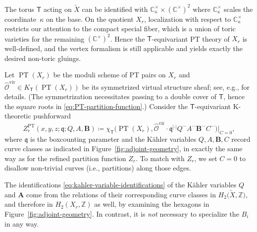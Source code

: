 \documentclass[pdftex]{sigma}%
\numberwithin{equation}{section}
\renewcommand{\hat}[1]{\widehat{#1}}
\renewcommand{\vec}[1]{\bm{#1}}
\renewcommand{\tilde}[1]{\widetilde{#1}}
\newcommand{\bC}{\mathbb{C}}
\newcommand{\bZ}{\mathbb{Z}}
\newcommand{\cO}{\mathcal{O}}
\newcommand{\fq}{\mathfrak{q}}
\newcommand{\sT}{\mathsf{T}}
\newcommand{\vir}{\mathrm{vir}}
\DeclareMathOperator{\PT}{PT}
\begin{document}
\begin{MyParagraph}
The torus $\sT$ acting on $\tilde X$ can be identified with
$\bC_\kappa^\times \times (\bC^\times)^2$ where $\bC_\kappa^\times$
scales the coordinate~$\kappa$ on the base. On the quotient $X_r$,
localization with respect to $\bC_{\kappa}^\times$ restricts our
attention to the compact special fiber, which is a union of toric
varieties for the remaining $(\bC^\times)^2$. Hence the
$\sT$-equivariant PT theory of $X_r$ is well-defined, and the vertex
formalism is still applicable and yields exactly the desired non-toric
gluings.

\begin{Definition}
 Let $\PT(X_r)$ be the moduli scheme of PT pairs on $X_r$ and
 $\hat\cO^{\vir} \in K_{\sT}(\PT(X_r))$ be its symmetrized virtual
 structure sheaf; see, e.g., \cite[Section~3.2]{Okounkov2017} for details.
 (The symmetrization necessitates passing to a double cover of $\sT$,
 hence the square roots in \eqref{eq:PT-partition-function}.)
 Consider the $\sT$-equivariant K-theoretic pushforward
 \begin{equation}\label{eq:adjoint-PT-function}
 Z_r^{\PT}(x, y, z; \fq; Q, A, \vec B) \coloneqq \chi_{\sT}\big(\PT(X_r), \hat\cO^{\vir} \cdot \fq^{|\cdot|} Q^{\cdots} A^{\cdots} \vec B^{\cdots} C^{\cdots} \big)\big|_{C=0},
 \end{equation}
 where $\fq$ is the boxcounting parameter and the K\"ahler variables
 $Q, A, \vec B, C$ record curve classes as indicated in
 Figure~\ref{fig:adjoint-geometry}, in exactly the same way as for
 the refined partition function $Z_r$. To match with $Z_r$, we set $C
 = 0$ to disallow non-trivial curves (i.e., partitions) along those edges.
\end{Definition}

\begin{Remark}
 The identifications \eqref{eq:kahler-variable-identifications} of
 the K\"ahler variables $Q$ and $\vec A$ come from the relations of
 their corresponding curve classes in $H_2\big(\tilde X, \bZ\big)$, and
 therefore in $H_2(X_r, \bZ)$ as well, by examining the hexagons in
 Figure~\ref{fig:adjoint-geometry}. In contrast, it is {\it not}
 necessary to specialize the $B_i$ in any way.
\end{Remark}
\end{MyParagraph}
\end{document}
